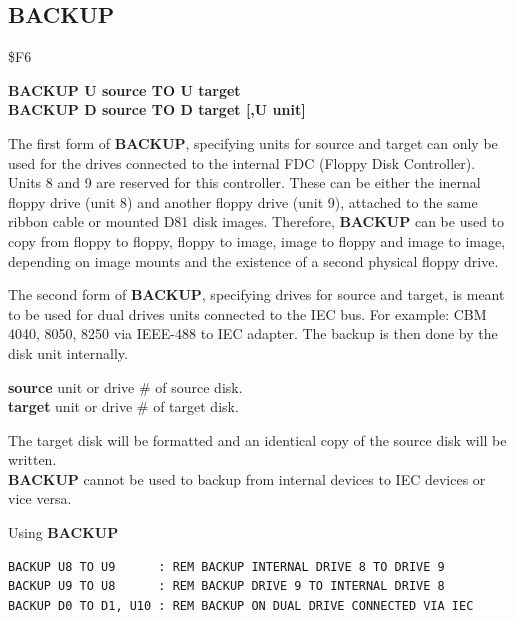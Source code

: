 
\newpage
\subsection{BACKUP}
\begin{description}[leftmargin=2cm,style=nextline]
\item [Token:] \$F6
\item [Format:] {\bf BACKUP U source TO U target} \\
                {\bf BACKUP D source TO D target [,U unit]}
\item [Usage:] The first form of {\bf BACKUP}, specifying
               units for source and target can only be used for the drives
               connected to the internal FDC (Floppy Disk Controller).
               Units 8 and 9 are reserved for this controller.
               These can be either the inernal floppy drive (unit 8) and
               another floppy drive (unit 9), attached to the same ribbon cable
               or mounted D81 disk images. Therefore, {\bf BACKUP} can be used to
               copy from floppy to floppy, floppy to image, image to floppy
               and image to image, depending on image mounts and the existence of
               a second physical floppy drive.

               The second form of {\bf BACKUP}, specifying
               drives for source and target, is meant to be used for
               dual drives units connected to the IEC bus.
   For example: CBM 4040, 8050, 8250 via IEEE-488 to IEC adapter.
   The backup is then done by the disk unit internally.

   {\bf source} unit or drive \# of source disk. \\
   {\bf target} unit or drive \# of target disk.

\item [Remarks:] The target disk will be formatted and
                 an identical copy of the source disk will be written. \\
                 {\bf BACKUP} cannot be used to backup
                 from internal devices to IEC devices or vice versa.

\item [Examples:] Using {\bf BACKUP}

\begin{tcolorbox}[colback=black,coltext=white]
\verbatimfont{\codefont}
\begin{verbatim}
BACKUP U8 TO U9      : REM BACKUP INTERNAL DRIVE 8 TO DRIVE 9
BACKUP U9 TO U8      : REM BACKUP DRIVE 9 TO INTERNAL DRIVE 8
BACKUP D0 TO D1, U10 : REM BACKUP ON DUAL DRIVE CONNECTED VIA IEC
\end{verbatim}
\end{tcolorbox}
\end{description}

